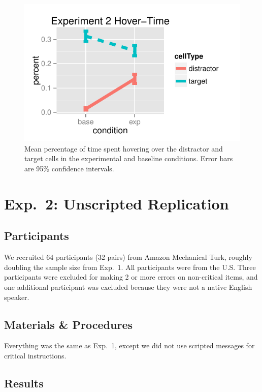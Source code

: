 \documentclass[10pt,letterpaper]{article}
\begin{document}
\begin{figure}[b!]
\begin{center}
\includegraphics[scale=.9]{images/exp2MouseTracking.pdf}
\caption{Mean percentage of time spent hovering over the distractor and target cells in the experimental and baseline conditions. Error bars are 95\% confidence intervals.}
\label{fig:exp2hover}
\end{center}
\end{figure}
\section{Exp.~2: Unscripted Replication}
\label{sec:Exp2}

\subsection{Participants}

We recruited 64 participants (32 pairs) from Amazon Mechanical Turk, roughly doubling the sample size from Exp.~1. All participants were from the U.S. Three participants were excluded for making 2 or more errors on non-critical items, and one additional participant was excluded because they were not a native English speaker.

\subsection{Materials \& Procedures}

Everything was the same as Exp.~1, except we did not use scripted messages for critical instructions. 
 
\subsection{Results}
\end{document}
